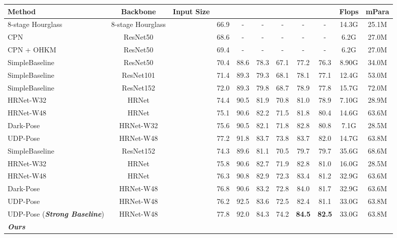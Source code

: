 \documentclass[10pt,twocolumn,letterpaper]{article}
\begin{document}
\begin{table*}[t]
\centering
\fontsize{7}{8}\selectfont
\begin{tabular}{l|c|c|c|ccccc|c|c}
\hline
Method       & Backbone   & Input Size    &    &  &  &   &   &  & Flops& mPara \\ \hline \hline
8-stage Hourglass~\cite{Newell16} & 8-stage Hourglass &  & 66.9 & - &- & - & 
- &  - & 14.3G & 25.1M\\
CPN \cite{Chen2018} & ResNet50 &  & 68.6 & - & - & - & - & - & 6.2G & 27.0M\\
CPN + OHKM  \cite{Chen2018} & ResNet50 &  & 69.4 & - & - & - & - & - & 6.2G & 27.0M\\
SimpleBaseline \cite{Xiao18} & ResNet50 &  & 70.4 & 88.6 &78.3 & 67.1 & 77.2 & 76.3 & 8.90G &34.0M\\
SimpleBaseline \cite{Xiao18} & ResNet101 &  & 71.4 & 89.3 & 79.3 & 68.1 & 78.1 & 77.1 &12.4G &53.0M\\
SimpleBaseline \cite{Xiao18} & ResNet152 &  & 72.0 & 89.3 &79.8 & 68.7 & 78.9 & 77.8 &15.7G &72.0M\\
HRNet-W32 \cite{Sun2019} & HRNet &  & 74.4 & 90.5 &81.9 & 70.8 & 81.0 & 78.9 &7.10G &28.9M\\
HRNet-W48 \cite{Sun2019} & HRNet &  & 75.1 & 90.6 &82.2 & 71.5 & 81.8 &  80.4 &14.6G&63.6M\\
Dark-Pose \cite{Zhang2020} & HRNet-W32 &  & 75.6 & 90.5 &82.1 & 71.8 & 82.8 & 80.8 &7.1G &28.5M\\
UDP-Pose \cite{Huang2020} & HRNet-W48 &  & 77.2 & 91.8 &83.7 & 73.8 & 83.7 & 82.0 &14.7G &63.8M\\
\hline
SimpleBaseline \cite{Xiao18} & ResNet152 &  & 74.3 & 89.6 & 81.1 & 70.5 & 79.7 & 79.7 &35.6G &68.6M\\
HRNet-W32 \cite{Sun2019} & HRNet &  & 75.8 & 90.6 & 82.7 & 71.9 & 82.8 & 81.0 &16.0G &28.5M\\
HRNet-W48 \cite{Sun2019} & HRNet &  & 76.3 & 90.8 & 82.9 & 72.3 & 83.4 & 81.2 &32.9G &63.6M\\
Dark-Pose \cite{Zhang2020} & HRNet-W48 &  & 76.8 &90.6 & 83.2 & 72.8 & 84.0 & 81.7 &32.9G &63.6M\\
UDP-Pose \cite{Huang2020} & HRNet-W48 &  &76.2& 92.5& 83.6& 72.5& 82.4& 81.1&33.0G &63.8M\\
UDP-Pose \cite{Huang2020} (\textbf{\textsl{Strong Baseline}}) & HRNet-W48 &  & 77.8 & 92.0 &84.3 &74.2  &\textbf{84.5}  & \textbf{82.5} &33.0G &63.8M\\
\hline
\textbf{\textit{Ours}} & & & & & & & & && \\

\end{tabular}
\end{table*}
\end{document}

